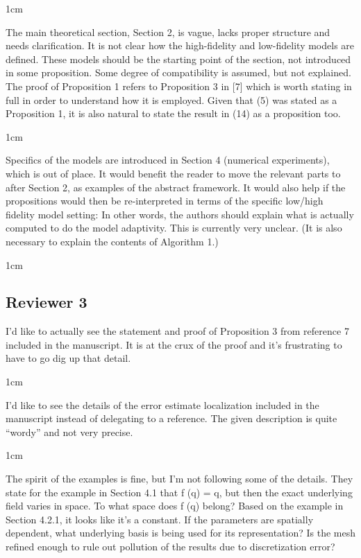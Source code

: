 \documentclass[12pt, letterpaper]{article}
\newcommand{\answer}[1]{\begin{adjustwidth}{1cm}{}{\color{blue}#1}\end{adjustwidth}}
\newcommand{\notdone}{{\color{red}{Changes not yet made.}}}
\begin{document}
\answer{}
\notdone

The main theoretical section, Section 2, is vague, lacks proper structure and needs clarification. It is not clear how the high-fidelity and low-fidelity models are defined. These models should be the starting point of the section, not introduced in some proposition. Some degree of compatibility is assumed, but not explained. The proof of Proposition 1 refers to Proposition 3 in [7] which is worth stating in full in order to understand how it is employed. Given that (5) was stated as a Proposition 1, it is also natural to state the result in (14) as a proposition too. 

\answer{}
\notdone

Specifics of the models are introduced in Section 4 (numerical experiments), which is out of place. It would benefit the reader to move the relevant parts to after Section 2, as examples of the abstract framework. It would also help if the propositions would then be re-interpreted in terms of the specific low/high fidelity model setting: In other words, the authors should explain what is actually computed to do the model adaptivity. This is currently very unclear. (It is also necessary to explain the contents of Algorithm 1.)

\answer{}
\notdone


\subsection*{Reviewer 3}

I’d like to actually see the statement and proof of Proposition 3 from reference 7 included in
the manuscript. It is at the crux of the proof and it’s frustrating to have to go dig up that
detail.

\answer{}
\notdone

I’d like to see the details of the error estimate localization included in the manuscript instead
of delegating to a reference. The given description is quite “wordy” and not very precise.

\answer{}
\notdone

The spirit of the examples is fine, but I’m not following some of the details. They state for
the example in Section 4.1 that f (q) = q, but then the exact underlying field varies in space.
To what space does f (q) belong? Based on the example in Section 4.2.1, it looks like it’s
a constant. If the parameters are spatially dependent, what underlying basis is being used
for its representation? Is the mesh refined enough to rule out pollution of the results due to
discretization error?
\end{document}

